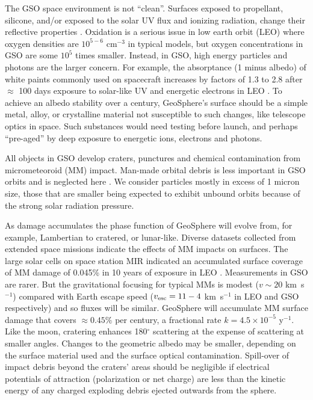\documentclass[useAMS,usenatbib]{mn2e}
\newcommand{\highlight}{\color{red} }
\renewcommand{\highlight}{}
\newcommand\name{LAMBERT}
\renewcommand\name{GeoSphere}
\begin{document}
The GSO space environment is not ``clean''.  {\highlight Surfaces exposed to
propellant, silicone, and/or exposed to the solar UV flux and
ionizing radiation, change their reflective properties
\citep{Dever+others2012}.  Oxidation is a serious issue in low earth orbit (LEO) where 
oxygen densities are 
$10^{5-6}$ cm$^{-3}$ in typical models, but oxygen 
concentrations in GSO are some $10^5$ times smaller. 
Instead, in GSO, high energy particles and photons are the larger concern. 
For example, the 
absorptance (1 minus albedo) of white paints 
commonly used on spacecraft increases by factors of 1.3 to 2.8
after $\approx$ 100 days exposure to solar-like UV and
energetic electrons in LEO \citep[][Table 4]{Dever+others2012}.  To achieve 
an albedo stability over a century, \name{}'s
surface should be a simple metal, alloy, or crystalline 
material not susceptible to such changes, like telescope optics 
in space.   Such substances would need 
testing before launch, and perhaps 
``pre-aged'' by deep exposure to energetic ions, electrons and photons. }

All objects in GSO develop craters, punctures and chemical
contamination from micrometeoroid (MM) impact. Man-made orbital debris
is less important in GSO orbits and is neglected here
\citep{nsa_damage}.  We consider particles mostly in excess of 1
micron size, those that are smaller being expected to exhibit unbound
orbits because of the strong solar radiation pressure.

 As damage accumulates the phase function of \name{}
 will evolve from, for example, Lambertian to cratered, or lunar-like.
 Diverse datasets collected from extended space missions indicate the
 effects of MM impacts on surfaces.  The large solar cells on space
 station MIR indicated an accumulated surface coverage of MM damage of
 0.045\% in 10 years of exposure in LEO \citep{Smirnov+others2000}.
 Measurements in GSO are rarer. But the gravitational focusing
 for typical MMs is modest ($v \sim 20 $ km~s$^{-1}$) compared with Earth
 escape speed ($v_{\rm esc} = 11-4$ km~s$^{-1}$ in LEO and GSO
 respectively) and so fluxes will be similar.  \name{} will accumulate
 MM surface damage that covers $\approx0.45\%$ per century, a fractional 
rate 
$k= 4.5\times10^{-5}$ y$^{-1}$.  Like the
 moon, cratering enhances 180$^\circ$ scattering at the expense of
 scattering at smaller angles.  Changes to the geometric albedo may be
 smaller, depending on the surface material used and the surface 
optical contamination. {\highlight Spill-over of impact debris beyond the craters'
areas should be negligible if electrical potentials
of attraction (polarization or net charge) are less than the kinetic
energy of any charged exploding debris ejected outwards from the sphere.}
\end{document}
